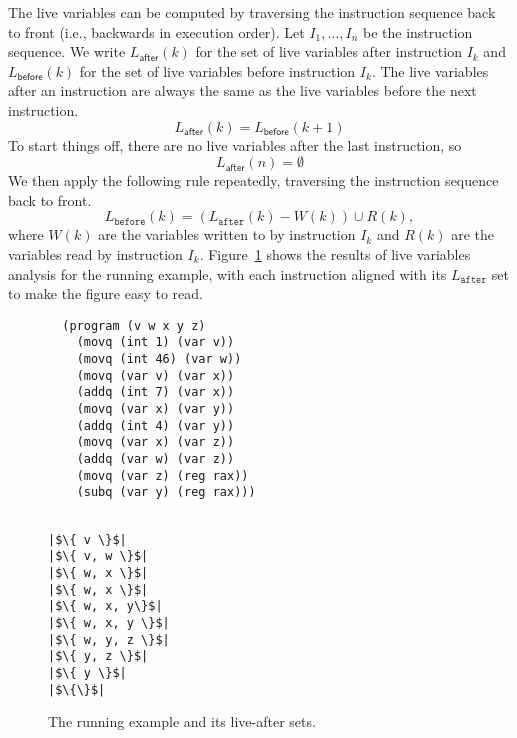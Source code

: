 \documentclass[11pt]{book}
\begin{document}
The live variables can be computed by traversing the instruction
sequence back to front (i.e., backwards in execution order).  Let
$I_1,\ldots, I_n$ be the instruction sequence. We write
$L_{\mathsf{after}}(k)$ for the set of live variables after
instruction $I_k$ and $L_{\mathsf{before}}(k)$ for the set of live
variables before instruction $I_k$. The live variables after an
instruction are always the same as the live variables before the next
instruction.
\begin{equation*}
  L_{\mathsf{after}}(k) = L_{\mathsf{before}}(k+1)
\end{equation*}
To start things off, there are no live variables after the last
instruction, so 
\begin{equation*}
  L_{\mathsf{after}}(n) = \emptyset 
\end{equation*}
We then apply the following rule repeatedly, traversing the
instruction sequence back to front.
\begin{equation*}
  L_{\mathtt{before}}(k) = (L_{\mathtt{after}}(k) - W(k)) \cup R(k),
\end{equation*}
where $W(k)$ are the variables written to by instruction $I_k$ and
$R(k)$ are the variables read by instruction $I_k$.
Figure~\ref{fig:live-eg} shows the results of live variables analysis
for the running example, with each instruction aligned with its
$L_{\mathtt{after}}$ set to make the figure easy to read.


\begin{figure}[tbp]
\hspace{20pt}
\begin{minipage}{0.45\textwidth}
\begin{lstlisting}
  (program (v w x y z)
    (movq (int 1) (var v))
    (movq (int 46) (var w))
    (movq (var v) (var x))
    (addq (int 7) (var x))
    (movq (var x) (var y))
    (addq (int 4) (var y))
    (movq (var x) (var z))
    (addq (var w) (var z))
    (movq (var z) (reg rax))
    (subq (var y) (reg rax)))
\end{lstlisting}
\end{minipage}
\vrule\hspace{10pt}
\begin{minipage}{0.45\textwidth}
\begin{lstlisting}

|$\{ v \}$|
|$\{ v, w \}$|
|$\{ w, x \}$|
|$\{ w, x \}$|
|$\{ w, x, y\}$|
|$\{ w, x, y \}$|
|$\{ w, y, z \}$|
|$\{ y, z \}$|
|$\{ y \}$|
|$\{\}$|
\end{lstlisting}
\end{minipage}

\caption{The running example and its live-after sets.}
\label{fig:live-eg}
\end{figure}
\end{document}
